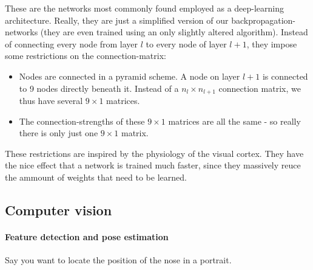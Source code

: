 These are the networks most commonly found employed as a deep-learning architecture. Really, they are just a simplified version of our backpropagation-networks (they are even trained using an only slightly altered algorithm). Instead of connecting every node from layer $l$ to every node of layer $l+1$, they impose some restrictions on the connection-matrix:
\begin{itemize}
	\item Nodes are connected in a pyramid scheme. A node on layer $l+1$ is connected to 9 nodes directly beneath it. Instead of a $n_l \times n_{l+1}$ connection matrix, we thus have several $9 \times 1$ matrices.
	\item The connection-strengths of these  $9 \times 1$ matrices are all the same - so really there is only just one  $9 \times 1$ matrix. 
\end{itemize}
These restrictions are inspired by the physiology of the visual cortex. They have the nice effect that a network is trained much faster, since they massively reuce the ammount of weights that need to be learned. 

\subsection{Computer vision}

\paragraph{Feature detection and pose estimation}

Say you want to locate the position of the nose in a portrait. 
